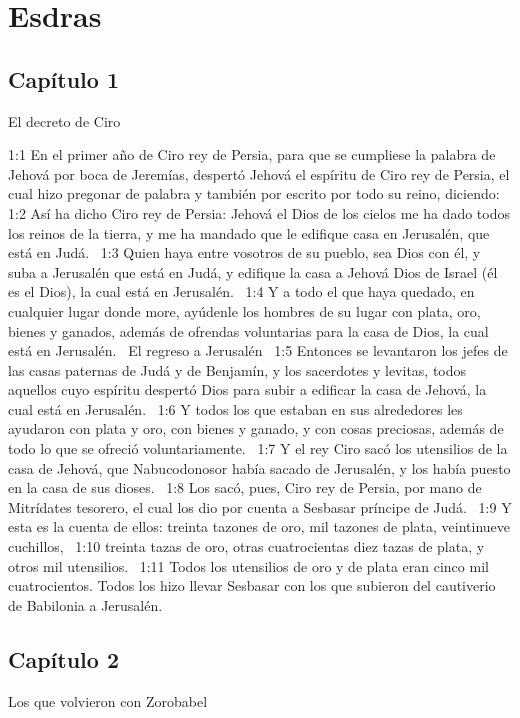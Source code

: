 \chapter{Esdras}

\section*{Capítulo 1}
El decreto de Ciro  

1:1 En el primer año de Ciro rey de Persia, para que se cumpliese la palabra de Jehová por boca de Jeremías, despertó Jehová el espíritu de Ciro rey de Persia, el cual hizo pregonar de palabra y también por escrito por todo su reino, diciendo:  
1:2 Así ha dicho Ciro rey de Persia: Jehová el Dios de los cielos me ha dado todos los reinos de la tierra, y me ha mandado que le edifique casa en Jerusalén, que está en Judá.  
1:3 Quien haya entre vosotros de su pueblo, sea Dios con él, y suba a Jerusalén que está en Judá, y edifique la casa a Jehová Dios de Israel (él es el Dios), la cual está en Jerusalén.  
1:4 Y a todo el que haya quedado, en cualquier lugar donde more, ayúdenle los hombres de su lugar con plata, oro, bienes y ganados, además de ofrendas voluntarias para la casa de Dios, la cual está en Jerusalén.  
El regreso a Jerusalén  
1:5 Entonces se levantaron los jefes de las casas paternas de Judá y de Benjamín, y los sacerdotes y levitas, todos aquellos cuyo espíritu despertó Dios para subir a edificar la casa de Jehová, la cual está en Jerusalén.  
1:6 Y todos los que estaban en sus alrededores les ayudaron con plata y oro, con bienes y ganado, y con cosas preciosas, además de todo lo que se ofreció voluntariamente.  
1:7 Y el rey Ciro sacó los utensilios de la casa de Jehová, que Nabucodonosor había sacado de Jerusalén, y los había puesto en la casa de sus dioses.  
1:8 Los sacó, pues, Ciro rey de Persia, por mano de Mitrídates tesorero, el cual los dio por cuenta a Sesbasar príncipe de Judá.  
1:9 Y esta es la cuenta de ellos: treinta tazones de oro, mil tazones de plata, veintinueve cuchillos,  
1:10 treinta tazas de oro, otras cuatrocientas diez tazas de plata, y otros mil utensilios.  
1:11 Todos los utensilios de oro y de plata eran cinco mil cuatrocientos. Todos los hizo llevar Sesbasar con los que subieron del cautiverio de Babilonia a Jerusalén.  
\section*{Capítulo 2}
Los que volvieron con Zorobabel   

